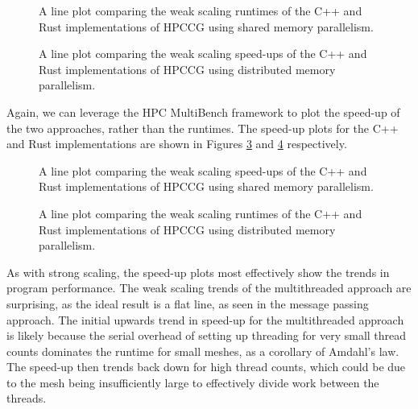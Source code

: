 \begin{figure}[H]
    \centering
    
    \caption{A line plot comparing the weak scaling runtimes of the C++ and Rust implementations of HPCCG using shared memory parallelism.}
    \label{fig:weak_scaling_threaded}
\end{figure}

\begin{figure}[H]
    \centering
    
    \caption{A line plot comparing the weak scaling speed-ups of the C++ and Rust implementations of HPCCG using distributed memory parallelism.}
    \label{fig:weak_scaling_mpi}
\end{figure}

Again, we can leverage the HPC MultiBench framework to plot the speed-up of the two approaches, rather than the runtimes. The speed-up plots for the C++ and Rust implementations are shown in Figures \ref{fig:weak_scaling_speedup_threaded} and \ref{fig:weak_scaling_speedup_mpi} respectively.

\begin{figure}[H]
    \centering
    
    \caption{A line plot comparing the weak scaling speed-ups of the C++ and Rust implementations of HPCCG using shared memory parallelism.}
    \label{fig:weak_scaling_speedup_threaded}
\end{figure}

\begin{figure}[H]
    \centering
    
    \caption{A line plot comparing the weak scaling runtimes of the C++ and Rust implementations of HPCCG using distributed memory parallelism.}
    \label{fig:weak_scaling_speedup_mpi}
\end{figure}

As with strong scaling, the speed-up plots most effectively show the trends in program performance. The weak scaling trends of the multithreaded approach are surprising, as the ideal result is a flat line, as seen in the message passing approach. The initial upwards trend in speed-up for the multithreaded approach is likely because the serial overhead of setting up threading for very small thread counts dominates the runtime for small meshes, as a corollary of Amdahl's law. The speed-up then trends back down for high thread counts, which could be due to the mesh being insufficiently large to effectively divide work between the threads.

